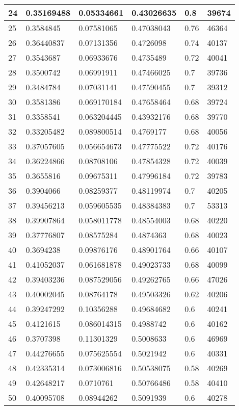 \begin{longtable}{|l|l|l|l|l|l|}
24 & 0.35169488 & 0.05334661 & 0.43026635 & 0.8 & 39674 \\ \hline 
25 & 0.3584845 & 0.07581065 & 0.47038043 & 0.76 & 46364 \\ \hline 
26 & 0.36440837 & 0.07131356 & 0.4726098 & 0.74 & 40137 \\ \hline 
27 & 0.3543687 & 0.06933676 & 0.4735489 & 0.72 & 40041 \\ \hline 
28 & 0.3500742 & 0.06991911 & 0.47466025 & 0.7 & 39736 \\ \hline 
29 & 0.3484784 & 0.07031141 & 0.47590455 & 0.7 & 39312 \\ \hline 
30 & 0.3581386 & 0.069170184 & 0.47658464 & 0.68 & 39724 \\ \hline 
31 & 0.3358541 & 0.063204445 & 0.43932176 & 0.68 & 39770 \\ \hline 
32 & 0.33205482 & 0.089800514 & 0.4769177 & 0.68 & 40056 \\ \hline 
33 & 0.37057605 & 0.056654673 & 0.47775522 & 0.72 & 40176 \\ \hline 
34 & 0.36224866 & 0.08708106 & 0.47854328 & 0.72 & 40039 \\ \hline 
35 & 0.3655816 & 0.09675311 & 0.47996184 & 0.72 & 39783 \\ \hline 
36 & 0.3904066 & 0.08259377 & 0.48119974 & 0.7 & 40205 \\ \hline 
37 & 0.39456213 & 0.059605535 & 0.48384383 & 0.7 & 53313 \\ \hline 
38 & 0.39907864 & 0.058011778 & 0.48554003 & 0.68 & 40220 \\ \hline 
39 & 0.37776807 & 0.08575284 & 0.4874363 & 0.68 & 40023 \\ \hline 
40 & 0.3694238 & 0.09876176 & 0.48901764 & 0.66 & 40107 \\ \hline 
41 & 0.41052037 & 0.061681878 & 0.49023733 & 0.68 & 40099 \\ \hline 
42 & 0.39403236 & 0.087529056 & 0.49262765 & 0.66 & 47026 \\ \hline 
43 & 0.40002045 & 0.08764178 & 0.49503326 & 0.62 & 40206 \\ \hline 
44 & 0.39247292 & 0.10356288 & 0.49684682 & 0.6 & 40241 \\ \hline 
45 & 0.4121615 & 0.086014315 & 0.4988742 & 0.6 & 40162 \\ \hline 
46 & 0.3707398 & 0.11301329 & 0.5008633 & 0.6 & 46969 \\ \hline 
47 & 0.44276655 & 0.075625554 & 0.5021942 & 0.6 & 40331 \\ \hline 
48 & 0.42335314 & 0.073006816 & 0.50538075 & 0.58 & 40269 \\ \hline 
49 & 0.42648217 & 0.0710761 & 0.50766486 & 0.58 & 40410 \\ \hline 
50 & 0.40095708 & 0.08944262 & 0.5091939 & 0.6 & 40278 \\ \hline 
\end{longtable}